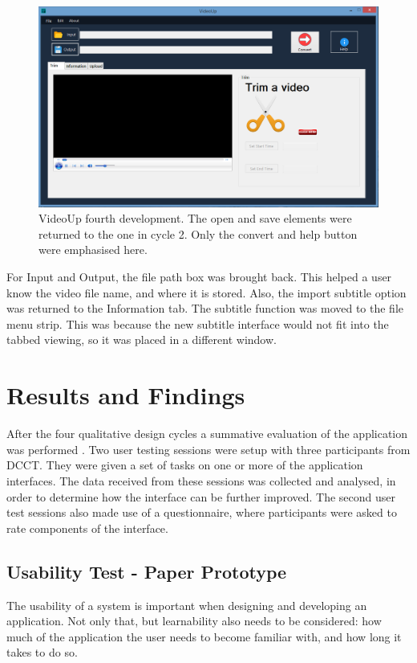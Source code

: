 \documentclass{sig-alternate-05-2015}
\begin{document}
\begin{figure} [h]
\includegraphics[scale=0.28]{dev4}
\caption{VideoUp fourth development. The open and save elements were returned to the one in cycle 2. Only the convert and help button were emphasised here.}
\end{figure}

For Input and Output, the file path box was brought back. This helped a user know the video file name, and where it is stored. Also, the import subtitle option was returned to the Information tab. The subtitle function was moved to the file menu strip. This was because the new subtitle interface would not fit into the tabbed viewing, so it was placed in a different window.

\section{Results and Findings}\label{Results Findings}
After the four qualitative design cycles a summative evaluation of the application was performed \cite{andrews2008evaluation}. Two user testing sessions were setup with three participants from DCCT. They were given a set of tasks on one or more of the application interfaces. The data received from these sessions was collected and analysed, in order to determine how the interface can be further improved. The second user test sessions also made use of a questionnaire, where participants were asked to rate components of the interface.

\subsection{Usability Test - Paper Prototype}\label{Paper Prototype}
The usability of a system is important when designing and developing an application. Not only that, but learnability also needs to be considered: how much of the application the user needs to become familiar with, and how long it takes to do so.
\end{document}
